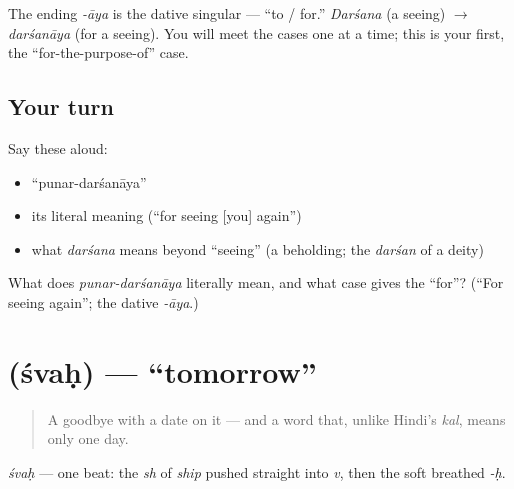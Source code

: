 \begin{grammarlens}[title={Grammar Lens: the dative \textquotedblleft{}for the sake of\textquotedblright{}}]
The ending \emph{-āya} is the dative singular — \textquotedblleft{}to / for.\textquotedblright{} \emph{Darśana} (a seeing) $\to$ \emph{darśanāya} (for a seeing). You will meet the cases one at a time; this is your first, the \textquotedblleft{}for-the-purpose-of\textquotedblright{} case.
\end{grammarlens}

\subsection*{Your turn}
Say these aloud:

\begin{itemize}
\raggedright
  \item \textquotedblleft{}punar-darśanāya\textquotedblright{}
  \item its literal meaning (\textquotedblleft{}for seeing {[}you{]} again\textquotedblright{})
  \item what \emph{darśana} means beyond \textquotedblleft{}seeing\textquotedblright{} (a beholding; the \emph{darśan} of a deity)
\end{itemize}

\begin{tcolorbox}[breakable,colback=teal!4,colframe=teal!35!black,title={Before you move on}]
What does \emph{punar-darśanāya} literally mean, and what case gives the \textquotedblleft{}for\textquotedblright{}? (\textquotedblleft{}For seeing again\textquotedblright{}; the dative \emph{-āya}.)
\end{tcolorbox}
\section[\texorpdfstring{\sk{श्वः} (śvaḥ)}{श्वः (śvaḥ)}]{ (śvaḥ) — \textquotedblleft{}tomorrow\textquotedblright{}}

\label{lesson:SA-C04-shvah}



\begin{quote}
A goodbye with a date on it — and a word that, unlike Hindi's \emph{kal}, means only one day.
\end{quote}

\begin{sounds}
\emph{śvaḥ} — one beat: the \emph{sh} of \emph{ship} pushed straight into \emph{v}, then the soft breathed \emph{-ḥ}.
\end{sounds}

